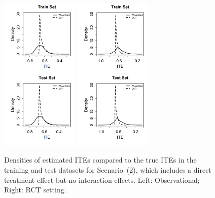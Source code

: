 \begin{figure}[htbp]
\centering
\includegraphics[width=0.33\textwidth]{img/results/observ_scenario2_ITE_densities_train_test.png}
\includegraphics[width=0.33\textwidth]{img/results/rct_scenario2_ITE_densities_train_test.png}
\vspace{-17pt}
\caption{Densities of estimated ITEs compared to the true ITEs in the training and test datasets for Scenario~(2), which includes a direct treatment effect but no interaction effects. Left: Observational; Right: RCT setting.}
\label{fig:scenario2_ite_densities_train_test}
\end{figure}






